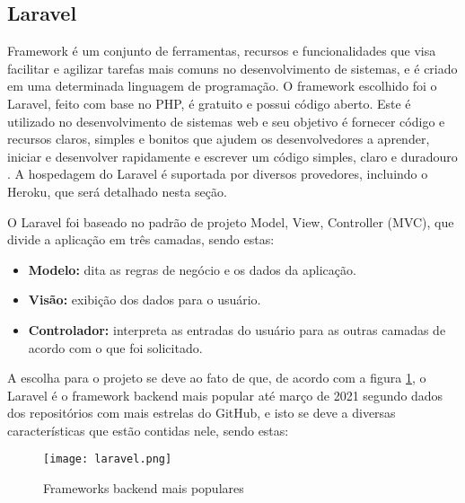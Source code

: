 \subsection{Laravel}
Framework é um conjunto de ferramentas, recursos e funcionalidades que visa facilitar e agilizar tarefas mais comuns no desenvolvimento de sistemas, e é criado em uma determinada linguagem de programação. O framework escolhido foi o Laravel, feito com base no PHP, é gratuito e possui código aberto. Este é utilizado no desenvolvimento de sistemas web e seu objetivo é fornecer código e recursos claros, simples e bonitos que ajudem os desenvolvedores a aprender, iniciar e desenvolver rapidamente e escrever um código simples, claro e duradouro \cite{STAUFFER}. A hospedagem do Laravel é suportada por diversos provedores, incluindo o Heroku, que será detalhado nesta seção. 

O Laravel foi baseado no padrão de projeto Model, View, Controller (MVC), que divide a aplicação em três camadas, sendo estas:
\begin{itemize}
    \item \textbf{Modelo:} dita as regras de negócio e os dados da aplicação.
    \item \textbf{Visão:} exibição dos dados para o usuário.
    \item \textbf{Controlador:} interpreta as entradas do usuário para as outras camadas de acordo com o que foi solicitado.
\end{itemize}

A escolha para o projeto se deve ao fato de que, de acordo com a figura \ref{framework_popular}, o Laravel é o framework backend mais popular até março de 2021 segundo dados dos repositórios com mais estrelas do GitHub, e isto se deve a diversas características que estão contidas nele, sendo estas:

\begin{figure}[H]
    \caption{\label{framework_popular}Frameworks backend mais populares}
    \vspace{5pt}
    \centering
    \texttt{[image: laravel.png]}
    \vspace{5pt}
\end{figure}

